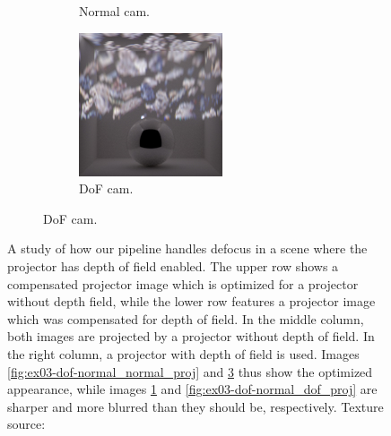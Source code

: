 \begin{figure}[]
\begin{subfigure}{\textwidth}
\begin{subfigure}{0.32\textwidth}
            \caption{Normal cam.}
            \label{fig:ex03-dof-defocused_normal_proj}
        \end{subfigure}
        \hfill
        \begin{subfigure}{0.32\textwidth}
            \centering
            \includegraphics[width=\textwidth]{images/04-experiment03/dof/defocused_on_dof.jpg}
            \caption{DoF cam.}
            \label{fig:ex03-dof-defocused_defocused_proj}
        \end{subfigure}
    \end{subfigure}
    \caption{A study of how our pipeline handles defocus in a scene where the projector has depth of field enabled. The upper row shows a compensated projector image which is optimized for a projector without depth field, while the lower row features a projector image which was compensated for depth of field. In the middle column, both images are projected by a projector without depth of field. In the right column, a projector with depth of field is used. Images \ref{fig:ex03-dof-normal_normal_proj} and \ref{fig:ex03-dof-defocused_defocused_proj} thus show the optimized appearance, while images \ref{fig:ex03-dof-defocused_normal_proj} and \ref{fig:ex03-dof-normal_dof_proj} are sharper and more blurred than they should be, respectively. Texture source: \citet{Pixar128}}
    \label{fig:ex03-dof}
\end{figure}

